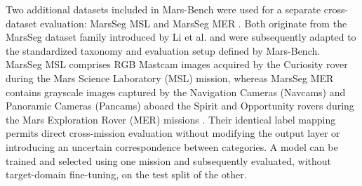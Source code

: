 Two additional datasets included in Mars-Bench were used for a separate cross-dataset evaluation: MarsSeg MSL and MarsSeg MER \cite{purohit2025marsbench}. Both originate from the MarsSeg dataset family introduced by Li et al. \cite{li2022covda} and were subsequently adapted to the standardized taxonomy and evaluation setup defined by Mars-Bench. MarsSeg MSL comprises RGB Mastcam images acquired by the Curiosity rover during the Mars Science Laboratory (MSL) mission, whereas MarsSeg MER contains grayscale images captured by the Navigation Cameras (Navcams) and Panoramic Cameras (Pancams) aboard the Spirit and Opportunity rovers during the Mars Exploration Rover (MER) missions \cite{li2022covda}. Their identical label mapping permits direct cross-mission evaluation without modifying the output layer or introducing an uncertain correspondence between categories. A model can be trained and selected using one mission and subsequently evaluated, without target-domain fine-tuning, on the test split of the other.

\begin{table}[ht]
    \centering
    \vspace{5mm}
    \caption{Mars-Bench semantic segmentation datasets used in this work.}
    \label{tab:mars-bench-datasets}
\end{table}

